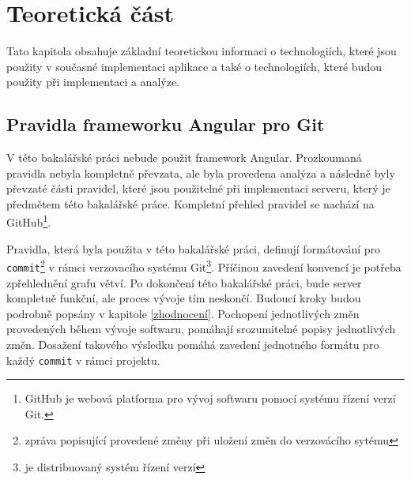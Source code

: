 \chapter{Teoretická část}\label{chapter:resere}
Tato kapitola obsahuje základní teoretickou informaci o technologiích, které jsou použity v současné implementaci aplikace a také o technologiích, které budou použity při implementaci a analýze.

\section{Pravidla frameworku Angular pro Git}\label{reserse:git}
    V této bakalářské práci nebude použit framework Angular. Prozkoumaná pravidla nebyla kompletně převzata, ale byla provedena analýza a následně byly převzaté části pravidel, které jsou použitelné při implementaci serveru, který je předmětem této bakalářské práce. Kompletní přehled pravidel se nachází na GitHub\footnote{ GitHub je webová platforma pro vývoj softwaru pomocí systému řízení verzí Git.}\cite{angular-git}.
    
    Pravidla, která byla použita v této bakalářské práci, definují formátování pro \verb|commit|\footnote{zpráva popisující provedené změny při uložení změn do verzovácího sytému} v rámci verzovacího systému Git\footnote{je distribuovaný systém řízení verzí}. Příčinou zavedení konvencí je potřeba zpřehlednění grafu větví. Po dokončení této bakalářské práci, bude server kompletně funkční, ale proces vývoje tím neskončí. Budoucí kroky budou podrobně popsány v kapitole \ref{zhodnocení}. Pochopení jednotlivých změn provedených během vývoje softwaru, pomáhají srozumitelné popisy jednotlivých změn. Dosažení takového výsledku pomáhá zavedení jednotného formátu pro každý \verb|commit| v rámci projektu.
    
